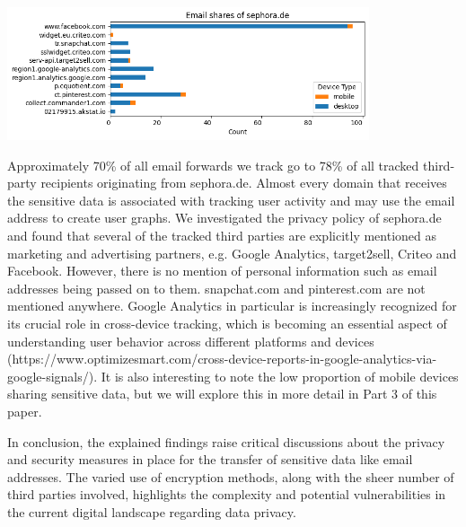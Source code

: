 \vspace{0.5cm}
\includegraphics[width=0.8\textwidth]{./assets/sephoracase.png}
\vspace{0.5cm}

Approximately 70\% of all email forwards we track go to 78\% of all tracked third-party recipients originating from sephora.de. Almost every domain that receives the sensitive data is associated with tracking user activity and may use the email address to create user graphs. We investigated the privacy policy of sephora.de\cite{SephoraDatenschutz} and found that several of the tracked third parties are explicitly mentioned as marketing and advertising partners, e.g. Google Analytics, target2sell, Criteo and Facebook. However, there is no mention of personal information such as email addresses being passed on to them. snapchat.com and pinterest.com are not mentioned anywhere. Google Analytics in particular is increasingly recognized for its crucial role in cross-device tracking, which is becoming an essential aspect of understanding user behavior across different platforms and devices (https://www.optimizesmart.com/cross-device-reports-in-google-analytics-via-google-signals/). It is also interesting to note the low proportion of mobile devices sharing sensitive data, but we will explore this in more detail in Part 3 of this paper.

In conclusion, the explained findings raise critical discussions about the privacy and security measures in place for the transfer of sensitive data like email addresses. The varied use of encryption methods, along with the sheer number of third parties involved, highlights the complexity and potential vulnerabilities in the current digital landscape regarding data privacy.

